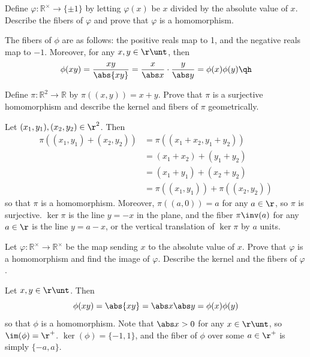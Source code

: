 \begin{exercise}\label{ex3.1.6}
    Define $\varphi : \mathbb{R}^{\times} \to \{\pm 1\}$ by letting $\varphi(x)$ be $x$ divided by the absolute value of $x$. Describe the fibers of $\varphi$ and prove that $\varphi$ is a homomorphism.
\end{exercise}

\begin{sol}
    The fibers of $\phi$ are as follows: the positive reals map to 1, and the negative reals map to $-1$. Moreover, for any $x, y \in \r\unt$, then
    \[\phi(xy) = \frac{xy}{\abs{xy}} = \frac{x}{\abs x} \cdot \frac{y}{\abs y} = \phi(x)\phi(y) \qh\]
\end{sol}

\begin{exercise}\label{ex3.1.7}
    Define $\pi : \mathbb{R}^2 \to \mathbb{R}$ by $\pi((x,y)) = x + y$. Prove that $\pi$ is a surjective homomorphism and describe the kernel and fibers of $\pi$ geometrically.
\end{exercise}

\begin{sol}
    Let $(x_1, y_1), (x_2, y_2) \in \r^2$. Then
    \begin{align*}
        \pi((x_1, y_1) + (x_2, y_2)) & = \pi((x_1 + x_2, y_1 + y_2)) \\
        & = (x_1 + x_2) + (y_1 + y_2) \\
        & = (x_1 + y_1) + (x_2 + y_2) \\
        & = \pi((x_1, y_1)) + \pi((x_2, y_2))
    \end{align*}
    so that $\pi$ is a homomorphism. Moreover, $\pi((a, 0)) = a$ for any $a \in \r$, so $\pi$ is surjective. $\ker\pi$ is the line $y = -x$ in the plane, and the fiber $\pi\inv(a)$ for any $a \in \r$ is the line $y = a - x$, or the vertical translation of $\ker\pi$ by $a$ units.
\end{sol}

\begin{exercise}\label{ex3.1.8}
    Let $\varphi : \mathbb{R}^{\times} \to \mathbb{R}^{\times}$ be the map sending $x$ to the absolute value of $x$. Prove that $\varphi$ is a homomorphism and find the image of $\varphi$. Describe the kernel and the fibers of $\varphi$.
\end{exercise}

\begin{sol}
    Let $x, y \in \r\unt$. Then
    \[\phi(xy) = \abs{xy} = \abs x \abs y = \phi(x)\phi(y)\]
    so that $\phi$ is a homomorphism. Note that $\abs x > 0$ for any $x \in \r\unt$, so $\im(\phi) = \r^+$. $\ker(\phi) = \{-1, 1\}$, and the fiber of $\phi$ over some $a \in \r^+$ is simply $\{-a, a\}$.
\end{sol}

